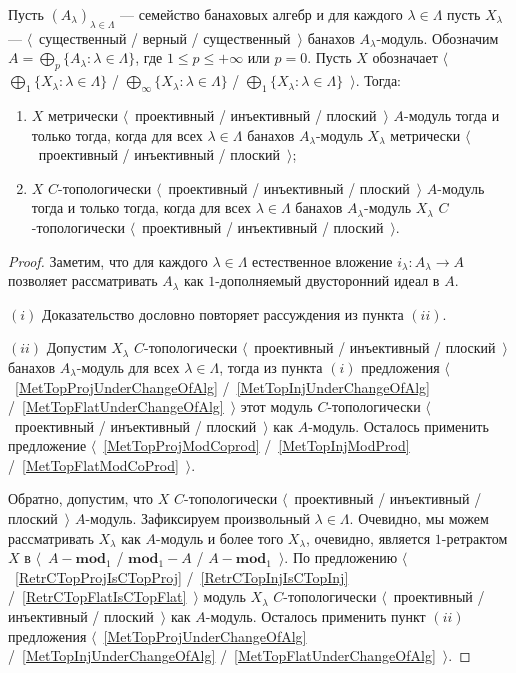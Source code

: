 \begin{proposition}\label{MetTopProjInjFlatUnderSumOfAlg} Пусть
${(A_\lambda)}_{\lambda\in\Lambda}$ --- семейство банаховых алгебр и для каждого
$\lambda\in\Lambda$ пусть $X_\lambda$ ---  $\langle$~существенный / верный /
существенный~$\rangle$ банахов $A_\lambda$-модуль. Обозначим $A=\bigoplus_p
\{A_\lambda:\lambda\in\Lambda \}$, где $1\leq p\leq +\infty$ или $p=0$. Пусть
$X$ обозначает $\langle$~$\bigoplus_1 \{X_\lambda:\lambda\in\Lambda \}$ /
$\bigoplus_\infty \{X_\lambda:\lambda\in\Lambda \}$ / $\bigoplus_1
\{X_\lambda:\lambda\in\Lambda \}$~$\rangle$. Тогда:
\begin{enumerate}[label = (\roman*)]
    \item $X$ метрически $\langle$~проективный / инъективный / плоский~$\rangle$
    $A$-модуль тогда и только тогда, когда для всех $\lambda\in\Lambda$ банахов
    $A_\lambda$-модуль $X_\lambda$ метрически $\langle$~проективный /
    инъективный / плоский~$\rangle$;

    \item $X$ $C$-топологически $\langle$~проективный / инъективный /
    плоский~$\rangle$ $A$-модуль тогда и только тогда, когда для всех
    $\lambda\in\Lambda$ банахов $A_\lambda$-модуль $X_\lambda$ $C$-топологически
    $\langle$~проективный / инъективный / плоский~$\rangle$.
\end{enumerate}
\end{proposition}
\begin{proof} Заметим, что для каждого $\lambda\in\Lambda$ естественное вложение
$i_\lambda:A_\lambda\to A$ позволяет рассматривать $A_\lambda$ как
$1$-дополняемый  двусторонний идеал в $A$.

$(i)$ Доказательство дословно повторяет рассуждения из пункта $(ii)$.

$(ii)$ Допустим $X_\lambda$ $C$-топологически $\langle$~проективный / инъективный
/ плоский~$\rangle$ банахов $A_\lambda$-модуль для всех $\lambda\in\Lambda$,
тогда из пункта $(i)$ предложения $\langle$~\ref{MetTopProjUnderChangeOfAlg}
/~\ref{MetTopInjUnderChangeOfAlg} /~\ref{MetTopFlatUnderChangeOfAlg}~$\rangle$
этот модуль $C$-топологически $\langle$~проективный / инъективный /
плоский~$\rangle$ как $A$-модуль. Осталось применить предложение
$\langle$~\ref{MetTopProjModCoprod} /~\ref{MetTopInjModProd}
/~\ref{MetTopFlatModCoProd}~$\rangle$. 

Обратно, допустим, что $X$ $C$-топологически $\langle$~проективный / инъективный
/ плоский~$\rangle$ $A$-модуль. Зафиксируем произвольный $\lambda\in\Lambda$.
Очевидно, мы можем рассматривать $X_\lambda$ как $A$-модуль и более того
$X_\lambda$, очевидно, является $1$-ретрактом $X$ в $\langle$~$A-\mathbf{mod}_1$
/ $\mathbf{mod}_1-A$ / $A-\mathbf{mod}_1$~$\rangle$. По предложению
$\langle$~\ref{RetrCTopProjIsCTopProj} /~\ref{RetrCTopInjIsCTopInj}
/~\ref{RetrCTopFlatIsCTopFlat}~$\rangle$ модуль $X_\lambda$ $C$-топологически
$\langle$~проективный / инъективный / плоский~$\rangle$ как $A$-модуль. Осталось
применить пункт  $(ii)$ предложения $\langle$~\ref{MetTopProjUnderChangeOfAlg}
/~\ref{MetTopInjUnderChangeOfAlg} /~\ref{MetTopFlatUnderChangeOfAlg}~$\rangle$.
\end{proof} 

